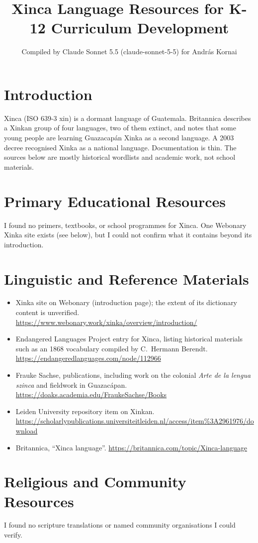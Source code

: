 \documentclass[12pt]{article}
\title{Xinca Language Resources for K-12 Curriculum Development}
\author{Compiled by Claude Sonnet 5.5 (claude-sonnet-5-5) for Andr\'as Kornai}
\date{}
\begin{document}
\maketitle

\section{Introduction}
Xinca (ISO 639-3 xin) is a dormant language of Guatemala. Britannica describes a Xinkan group of four languages, two of them extinct, and notes that some young people are learning Guazacapán Xinka as a second language. A 2003 decree recognised Xinka as a national language. Documentation is thin. The sources below are mostly historical wordlists and academic work, not school materials.

\section{Primary Educational Resources}
I found no primers, textbooks, or school programmes for Xinca. One Webonary Xinka site exists (see below), but I could not confirm what it contains beyond its introduction.

\section{Linguistic and Reference Materials}
\begin{itemize}
\item Xinka site on Webonary (introduction page); the extent of its dictionary content is unverified. \url{https://www.webonary.work/xinka/overview/introduction/}
\item Endangered Languages Project entry for Xinca, listing historical materials such as an 1868 vocabulary compiled by C.\ Hermann Berendt. \url{https://endangeredlanguages.com/node/112966}
\item Frauke Sachse, publications, including work on the colonial \emph{Arte de la lengua szinca} and fieldwork in Guazac\'apan. \url{https://doaks.academia.edu/FraukeSachse/Books}
\item Leiden University repository item on Xinkan. \url{https://scholarlypublications.universiteitleiden.nl/access/item%3A2961976/download}
\item Britannica, ``Xinca language''. \url{https://britannica.com/topic/Xinca-language}
\end{itemize}

\section{Religious and Community Resources}
I found no scripture translations or named community organisations I could verify.
\end{document}
